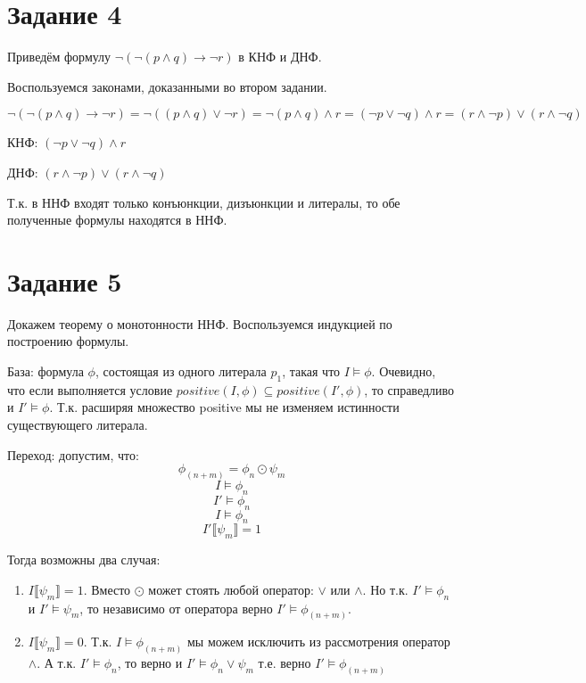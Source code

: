\documentclass{article}
\begin{document}
\section*{Задание 4}
Приведём формулу \(\neg(\neg(p \land q) \rightarrow \neg r)\) в КНФ и ДНФ.

Воспользуемся законами, доказанными во втором задании.

\[
    \neg(\neg(p \land q) \rightarrow \neg r) 
    = \neg((p \land q) \lor \neg r)
    = \neg (p \land q) \land r
    = (\neg p \lor \neg q) \land r 
    = (r \land \neg p) \lor (r \land \neg q)
\]

КНФ: \((\neg p \lor \neg q) \land r\)

ДНФ: \((r \land \neg p) \lor (r \land \neg q)\)

Т.к. в ННФ входят только конъюнкции, дизъюнкции и литералы, то обе полученные формулы находятся в ННФ.

\section*{Задание 5}
Докажем теорему о монотонности ННФ.
Воспользуемся индукцией по построению формулы.

База: формула \(\phi\), состоящая из одного литерала \(p_1\), такая что
\(I \models \phi\). Очевидно, что если выполняется условие 
\(positive(I, \phi) \subseteq positive(I', \phi)\), то справедливо и \(I' \models \phi\).
Т.к. расширяя множество positive мы не изменяем истинности существующего литерала.

Переход: допустим, что: 
\[\phi_{(n+m)} = \phi_{n} \odot \psi_{m}\] 
\[I \models \phi_{n}\]
\[I' \models \phi_{n}\]
\[I \models \phi_{n}\]
\[I' \llbracket \psi_m \rrbracket = 1 \]

Тогда возможны два случая:
\begin{enumerate}
    \item \(I \llbracket \psi_m \rrbracket = 1 \). 
    Вместо \(\odot\) может стоять любой оператор: \(\lor\) или \(\land\).
    Но т.к. \(I' \models \phi_{n}\) и \(I' \models \psi_m\), то независимо от оператора
    верно \(I' \models \phi_{(n+m)}\).

    \item \(I \llbracket \psi_m \rrbracket = 0 \). 
    Т.к. \(I \models \phi_{(n+m)}\) мы можем исключить из рассмотрения оператор \(\land\).
    А т.к. \(I' \models \phi_{n}\), то верно и 
    \(I' \models \phi_{n} \lor \psi_m\) т.е. верно 
    \(I' \models \phi_{(n+m)}\)
\end{enumerate}
\end{document}

